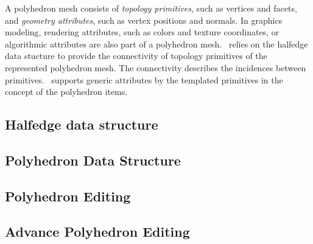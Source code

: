 A polyhedron mesh consists of \emph{topology primitives}, 
such as vertices and facets, and \emph{geometry attributes}, 
such as vertex positions and normals. 
In graphics modeling, rendering attributes, 
such as colors and texture coordinates, or algorithmic 
attributes are also part of a polyhedron mesh.
\cgalpoly\ relies on the halfedge data 
stucture \cite{hds} to provide the connectivity of 
topology primitives of the represented polyhedron mesh. 
The connectivity describes the incidences between 
primitives. \poly\ supports generic attributes 
by the templated primitives in the concept of the polyhedron
items.

\subsection{Halfedge data structure}


\subsection{Polyhedron Data Structure}
\label{sec:polyhedron}


\subsection{Polyhedron Editing}


\subsection{Advance Polyhedron Editing}

